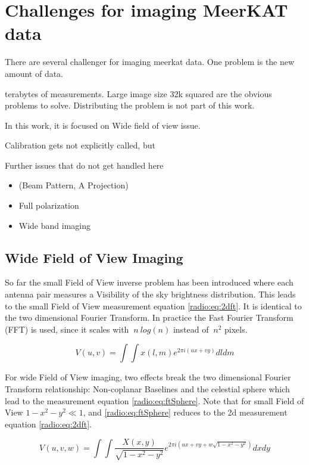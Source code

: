 \section{Challenges for imaging MeerKAT data} \label{meerkat}

There are several challenger for imaging meerkat data. One problem is the new amount of data.

terabytes of measurements. Large image size 32k squared are the obvious problems to solve. Distributing the problem is not part of this work.

 In this work, it is focused on Wide field of view issue. 


Calibration gets not explicitly called, but 

Further issues that do not get handled here
\begin{itemize}
	\item (Beam Pattern, A Projection)
	\item Full polarization
	\item Wide band imaging
\end{itemize}



\subsection{Wide Field of View Imaging} \label{wof}

So far the small Field of View inverse problem has been introduced where each antenna pair measures a Visibility of the sky brightness distribution. This leads to the small Field of View measurement equation \eqref{radio:eq:2dft}. It is identical to the two dimensional Fourier Transform. In practice the Fast Fourier Transform (FFT) is used, since it scales with $~n\:log(n)$ instead of $~n^2$ pixels.

\begin{equation}\label{radio:eq:2dft}
V(u, v) = \int\int x(l, m) e^{2 \pi i (ux+vy)} dl dm
\end{equation}

For wide Field of View imaging, two effects break the two dimensional Fourier Transform relationship: Non-coplanar Baselines and the celestial sphere which lead to the measurement equation \eqref{radio:eq:ftSphere}. Note that for small Field of View $1 - x^2 -y ^2 \ll 1$, and \eqref{radio:eq:ftSphere} reduces to the 2d measurement equation \eqref{radio:eq:2dft}.

\begin{equation}\label{meerkat:ftsphere}
	V(u, v, w) = \int\int \frac{X(x, y)}{\sqrt{1 - x^2 - y ^2}} e^{2 \pi i (ux+vy+ w\sqrt{1 - x^2 - y ^2})}dx dy
\end{equation}

